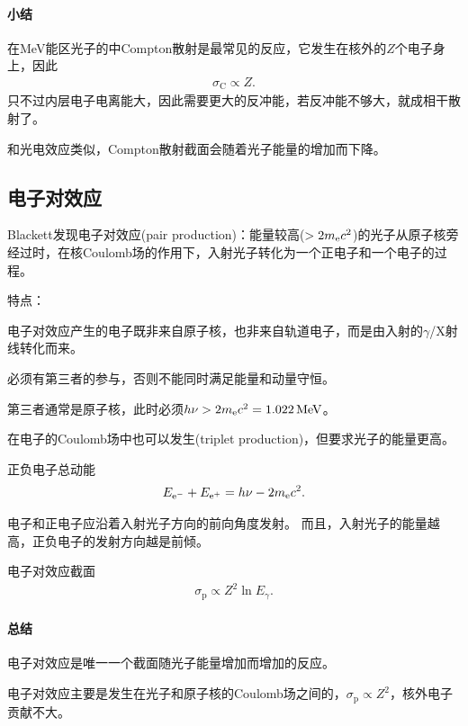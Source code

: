 \paragraph{小结}在MeV能区光子的中Compton散射是最常见的反应，它发生在核外的$Z$个电子身上，因此
\begin{align}
	\sigma_\mathrm C\propto Z.
\end{align}
只不过内层电子电离能大，因此需要更大的反冲能，若反冲能不够大，就成相干散射了。

和光电效应类似，Compton散射截面会随着光子能量的增加而下降。

\subsection{电子对效应}

Blackett发现电子对效应(pair production)：能量较高($>2m_\mathrm e c^2$)的光子从原子核旁经过时，在核Coulomb场的作用下，入射光子转化为一个正电子和一个电子的过程。

特点：
\begin{compactenum}
	\item 电子对效应产生的电子既非来自原子核，也非来自轨道电子，而是由入射的$\gamma$/X射线转化而来。
	\item 必须有第三者的参与，否则不能同时满足能量和动量守恒。
	\item 第三者通常是原子核，此时必须$h\nu>2m_\mathrm e c^2=\SI{1.022}{MeV}$。
	\item 在电子的Coulomb场中也可以发生(triplet production)，但要求光子的能量更高。
\end{compactenum}

正负电子总动能
\begin{align}
	E_{\mathrm e^-}+E_{\mathrm e^+}=h\nu-2m_{\mathrm e}c^2.
\end{align}

电子和正电子应沿着入射光子方向的前向角度发射。
而且，入射光子的能量越高，正负电子的发射方向越是前倾。

电子对效应截面
\begin{align}
	\sigma_\mathrm p\propto Z^2\ln E_{\gamma}.
\end{align}
\paragraph{总结}
电子对效应是唯一一个截面随光子能量增加而增加的反应。%

电子对效应主要是发生在光子和原子核的Coulomb场之间的，$\sigma_\mathrm p\propto Z^2$，核外电子贡献不大。

